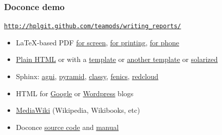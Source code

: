 \documentclass{beamer}
\begin{document}
\begin{frame}
\frametitle{Doconce demo}

\href{{http://hplgit.github.com/teamods/writing_reports/}}{\nolinkurl{http://hplgit.github.com/teamods/writing_reports/}}

\begin{itemize}
 \item LaTeX-based PDF \href{{http://hplgit.github.com/teamods/writing_reports/_static/report.pdf}}{for screen}, \href{{http://hplgit.github.com/teamods/writing_reports/_static/report_4printing.pdf}}{for printing}, \href{{http://hplgit.github.com/teamods/writing_reports/_static/report_4phone.pdf}}{for phone}

 \item \href{{http://hplgit.github.com/teamods/writing_reports/_static/report_do.html}}{Plain HTML} or with a \href{{http://hplgit.github.com/teamods/writing_reports/_static/report_vagrant.html}}{template} or \href{{http://hplgit.github.com/teamods/writing_reports/_static/report_github_minimal.html}}{another template} or \href{{http://hplgit.github.com/teamods/writing_reports/_static/report_solarized.html}}{solarized}

 \item Sphinx: \href{{http://hplgit.github.com/teamods/writing_reports/_static/sphinx-agni/index.html}}{agni}, \href{{http://hplgit.github.com/teamods/writing_reports/_static/sphinx-pyramid/report.html}}{pyramid}, \href{{http://hplgit.github.com/teamods/writing_reports/_static/sphinx-classy/report.html}}{classy}, \href{{http://hplgit.github.com/teamods/writing_reports/_static/sphinx-fenics_minimal/report.html}}{fenics}, \href{{http://hplgit.github.com/teamods/writing_reports/_static/sphinx-fenics_minimal/report.html}}{redcloud}

 \item HTML for \href{{http://doconce-report-demo.blogspot.no/}}{Google} or \href{{http://doconcereportdemo.wordpress.com/}}{Wordpress} blogs

 \item \href{{http://doconcedemo.shoutwiki.com/wiki/Doconce_demo_page}}{MediaWiki} (Wikipedia, Wikibooks, etc)

 \item Doconce \href{{http://hplgit.github.com/teamods/writing_reports/_static/report.do.txt.html}}{source code} and \href{{http://hplgit.github.io/doconce/doc/pub/manual/html/manual.html}}{manual}
\end{itemize}

\noindent
\end{frame}
\end{document}
